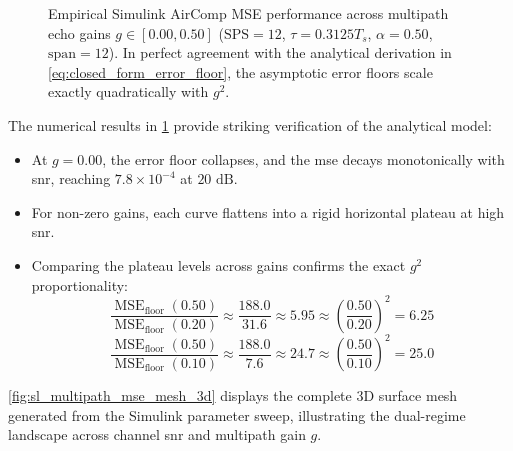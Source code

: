\documentclass[Markos_Delaportas_1316.tex]{subfiles}
\begin{document}
\begin{figure}[htbp]
    \caption{Empirical Simulink AirComp MSE performance across
        multipath echo gains $g \in [0.00, 0.50]$ ($\text{SPS} = 12$,
        $\tau = 0.3125 T_s$, $\alpha = 0.50$, $\text{span} = 12$). In
        perfect agreement with the analytical derivation in
        \cref{eq:closed_form_error_floor}, the asymptotic error floors
    scale exactly quadratically with $g^2$.}
    \label{fig:sl_multipath_fc_mse_gains}
\end{figure}

The numerical results in \cref{fig:sl_multipath_fc_mse_gains} provide
striking verification of the analytical model:
\begin{itemize}[leftmargin=*]
    \item At $g = 0.00$, the error floor collapses, and the \gls{mse}
        decays monotonically with \gls{snr}, reaching $7.8 \times
        10^{-4}$ at $20\text{ dB}$.
    \item For non-zero gains, each curve flattens into a rigid
        horizontal plateau at high \gls{snr}.
    \item Comparing the plateau levels across gains confirms the
        exact $g^2$ proportionality:
        \begin{equation}
            \frac{\operatorname{MSE}_{\text{floor}}(0.50)}{\operatorname{MSE}_{\text{floor}}(0.20)}
            \approx \frac{188.0}{31.6} \approx 5.95 \approx
            \left(\frac{0.50}{0.20}\right)^2 = 6.25
            \label{eq:gain_ratio_verification}
        \end{equation}
        \begin{equation}
            \frac{\operatorname{MSE}_{\text{floor}}(0.50)}{\operatorname{MSE}_{\text{floor}}(0.10)}
            \approx \frac{188.0}{7.6} \approx 24.7 \approx
            \left(\frac{0.50}{0.10}\right)^2 = 25.0
            \label{eq:gain_ratio_verification_10}
        \end{equation}
\end{itemize}

\cref{fig:sl_multipath_mse_mesh_3d} displays the complete 3D surface
mesh generated from the Simulink parameter sweep,
illustrating the dual-regime landscape across channel \gls{snr} and
multipath gain $g$.
\end{document}
